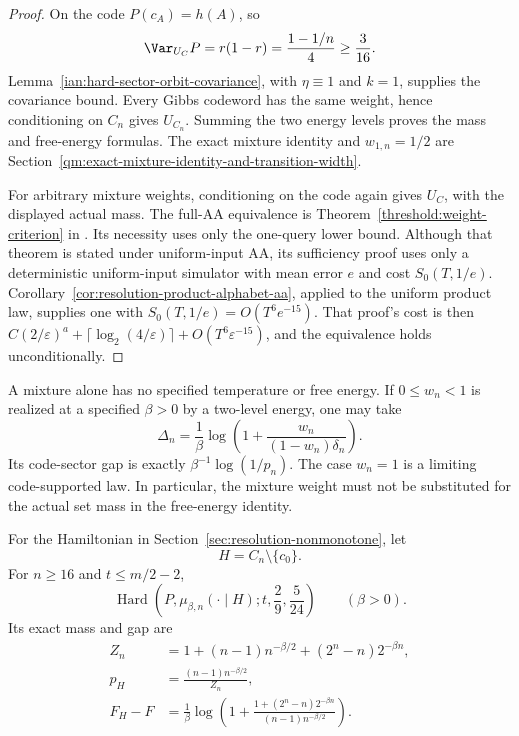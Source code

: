 \begin{proof}
On the code \(P(c_A)=h(A)\), so
\[
 \Var_{U_C}P=r(1-r)=\frac{1-1/n}{4}\ge\frac3{16}.
\]
Lemma~\ref{ian:hard-sector-orbit-covariance}, with \(\eta\equiv1\)
and \(k=1\), supplies the covariance bound. Every Gibbs codeword has
the same weight, hence conditioning on \(C_n\) gives \(U_{C_n}\).
Summing the two energy levels proves the mass and free-energy formulas.
The exact mixture identity and \(w_{1,n}=1/2\) are
Section~\ref{qm:exact-mixture-identity-and-transition-width}.

For arbitrary mixture weights, conditioning on the code again gives
\(U_C\), with the displayed actual mass. The full-AA equivalence is
Theorem~\ref{threshold:weight-criterion} in
.
Its necessity uses only the one-query lower bound. Although that
theorem is stated under uniform-input AA, its sufficiency proof uses
only a deterministic uniform-input simulator with mean error \(e\) and
cost \(S_0(T,1/e)\). Corollary~\ref{cor:resolution-product-alphabet-aa},
applied to the uniform product law, supplies one with
\(S_0(T,1/e)=O(T^6e^{-15})\). That proof's cost is then
\(C(2/\varepsilon)^a+\lceil\log_2(4/\varepsilon)\rceil
+O(T^6\varepsilon^{-15})\), and the equivalence holds unconditionally.
\end{proof}

A mixture alone has no specified temperature or free energy. If
\(0\le w_n<1\) is realized at a specified \(\beta>0\) by a two-level
energy, one may take
\[
 \Delta_n=\frac1\beta
 \log\left(1+\frac{w_n}{(1-w_n)\delta_n}\right).
\]
Its code-sector gap is exactly \(\beta^{-1}\log(1/p_n)\).
The case \(w_n=1\) is a limiting code-supported law. In particular,
the mixture weight must not be substituted for the actual set mass
in the free-energy identity.

\begin{proposition}
\label{ian:hard-sector-nonmonotone-instance}
For the Hamiltonian in
Section~\ref{sec:resolution-nonmonotone}, let
\[
 H=C_n\setminus\{c_0\}.
\]
For \(n\ge16\) and \(t\le m/2-2\),
\[
 \operatorname{Hard}\left(
 P,\mu_{\beta,n}(\cdot\mid H);
 t,\frac29,\frac5{24}\right)
 \qquad(\beta>0).
\]
Its exact mass and gap are
\[
 \begin{split}
 Z_n&=1+(n-1)n^{-\beta/2}+(2^n-n)2^{-\beta n},\\
 p_H&=\frac{(n-1)n^{-\beta/2}}{Z_n},\\
 F_H-F
 &=\frac1\beta\log\left(
 1+\frac{1+(2^n-n)2^{-\beta n}}
          {(n-1)n^{-\beta/2}}\right).
 \end{split}
\]
\end{proposition}

